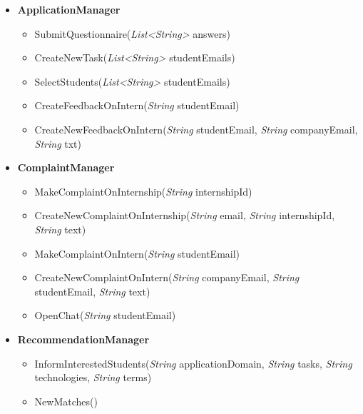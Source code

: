 \begin{itemize}
    \item \textbf{\textbf{ApplicationManager}}
\begin{itemize}
        \item SubmitQuestionnaire(\textit{List<String>} answers)
        \item CreateNewTask(\textit{List<String>} studentEmails)
        \item SelectStudents(\textit{List<String>} studentEmails)
        \item CreateFeedbackOnIntern(\textit{String} studentEmail)
        \item CreateNewFeedbackOnIntern(\textit{String} studentEmail, \textit{String} companyEmail, \textit{String} txt)
\end{itemize}

    \item \textbf{\textbf{ComplaintManager}}
\begin{itemize}
        \item MakeComplaintOnInternship(\textit{String} internshipId)
        \item CreateNewComplaintOnInternship(\textit{String} email, \textit{String} internshipId, \textit{String} text)
        \item MakeComplaintOnIntern(\textit{String} studentEmail)
        \item CreateNewComplaintOnIntern(\textit{String} companyEmail, \textit{String} studentEmail, \textit{String} text)
        \item OpenChat(\textit{String} studentEmail)
\end{itemize}

    \item \textbf{\textbf{RecommendationManager}}
\begin{itemize}
        \item InformInterestedStudents(\textit{String} applicationDomain, \textit{String} tasks, \textit{String} technologies, \textit{String}  terms)
        \item NewMatches(\textit{})
\end{itemize}

\end{itemize}

